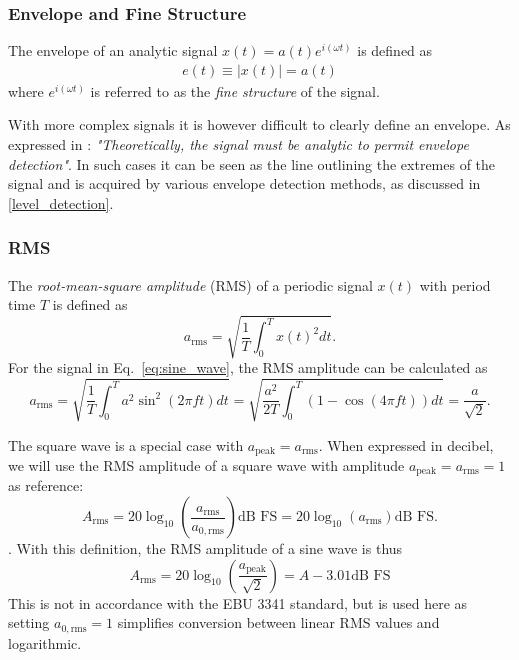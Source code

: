 \documentclass[../main2.tex]{subfiles}
\begin{document}
\subsubsection{Envelope and Fine Structure}
The envelope of an analytic signal $x(t) = a(t)e^{i(\omega t)}$ is defined as \cite{bedrosian1962analytic}
\begin{align}
e(t) \equiv |x(t)| = a(t)
\end{align}
where $e^{i(\omega t)}$ is referred to as the \emph{fine structure} of the signal.

With more complex signals it is however difficult to clearly define an envelope. As expressed in \cite{bedrosian1962analytic}: \emph{"Theoretically, the signal must be analytic to permit envelope detection"}. In such cases it can be seen as the line outlining the extremes of the signal and is acquired by various envelope detection methods, as discussed in \ref{level_detection}.

\subsubsection{RMS}
The \emph{root-mean-square amplitude} (RMS) of a periodic signal $x(t)$ with period time $T$ is defined as
\begin{equation}
a_\text{rms} = \sqrt{ \frac{1}{T} \int_{0}^{T} x(t)^2 dt }.
\end{equation}
For the signal in Eq.~\eqref{eq:sine_wave}, the RMS amplitude can be calculated as
\begin{equation}
a_\text{rms} =
\sqrt{ \frac{1}{T} \int_{0}^{T} a^2 \sin^2 (2 \pi f t) dt } =
\sqrt{ \frac{a^2}{2T} \int_{0}^{T}\left( 1 - \cos (4 \pi f t) \right) dt } =
\frac{a}{\sqrt 2}.
\end{equation}

The square wave is a special case with $a_\text{peak} = a_\text{rms}$. When expressed in decibel, we will use the RMS amplitude of a square wave with amplitude $a_\text{peak} = a_\text{rms} = 1$ as reference:
\begin{equation}
A_\text{rms} =
20 \log_{10} \left( \frac{a_\text{rms}}{a_{0, \text{rms}}} \right) \text{dB FS} =
20 \log_{10} \left( a_\text{rms} \right) \text{dB FS}.
\end{equation}.
With this definition, the RMS amplitude of a sine wave is thus
\begin{equation}
A_\text{rms} = 20\log_{10} \left( \frac{a_\text{peak}}{\sqrt 2} \right) = A - 3.01 \text{dB FS}
\end{equation}
This is not in accordance with the EBU 3341 standard, but is used here as setting $a_{0, \text{rms}} = 1$ simplifies conversion between linear RMS values and logarithmic.
\end{document}
